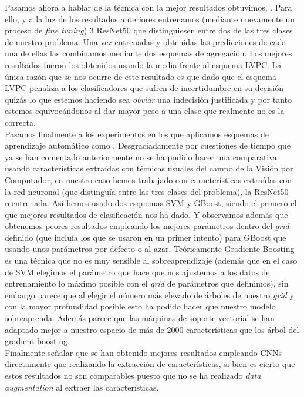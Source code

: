 Pasamos ahora a hablar de la técnica con la mejor resultados obtuvimos, . Para ello, y a la luz de los resultados anteriores entrenamos (mediante nuevamente un proceso de \textit{fine tuning}) 3 ResNet50 que distinguiesen entre dos de las tres clases de nuestro problema. Una vez entrenadas y obtenidas las predicciones de cada una de ellas las combinamos mediante dos esquemas de agregación. Los mejores resultados fueron los obtenidos usando la media frente al esquema LVPC. La única razón que se nos ocurre de este resultado es que dado que el esquema LVPC penaliza a los clasificadores que sufren de incertidumbre en su decisión quizás lo que estemos haciendo sea \textit{obviar} una indecisión justificada y por tanto estemos equivocándonos al dar mayor peso a una clase que realmente no es la correcta.\\

Pasamos finalmente a los experimentos en los que aplicamos esquemas de aprendizaje automático como . Desgraciadamente por cuestiones de tiempo que ya se han comentado anteriormente no se ha podido hacer una comparativa usando características extraídas con técnicas usuales del campo de la Visión por Computador, en nuestro caso hemos trabajado con características extraídas con la red neuronal (que distinguía entre las tres clases del problema), la ResNet50 reentrenada. Así hemos usado dos esquemas SVM y GBoost, siendo el primero el que mejores resultados de clasificación nos ha dado. Y observamos además que obtenemos peores resultados empleando los mejores parámetros dentro del \textit{grid} definido (que incluía los que se usaron en un primer intento) para GBoost que usando unos parámetros por defecto o al azar. Teóricamente Gradiente Boosting es una técnica que no es muy sensible al sobreaprendizaje (además que en el caso de SVM elegimos el parámetro que hace que nos ajustemos a los datos de entrenamiento lo máximo posible con el \textit{grid} de parámetros que definimos), sin embargo parece que al elegir el número más elevado de árboles de nuestro \textit{grid} y con la mayor profundidad posible esto ha podido hacer que nuestro modelo sobreaprenda. Además parece que las máquinas de soporte vectorial se han adaptado mejor a nuestro espacio de más de 2000 características que los árbol del gradient boosting.\\

Finalmente señalar que se han obtenido mejores resultados empleando CNNs directamente que realizando la extracción de características, si bien es cierto que estos resultados no son comparables puesto que no se ha realizado \textit{data augmentation} al extraer las características.





